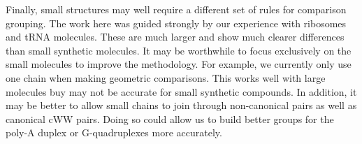 Finally, small structures may well require a different set of rules for
comparison grouping. The work here was guided strongly by our experience with
ribosomes and tRNA molecules. These are much larger and show much clearer
differences than small synthetic molecules. It may be worthwhile to focus
exclusively on the small molecules to improve the methodology. For example, we
currently only use one chain when making geometric comparisons. This works well
with large molecules buy may not be accurate for small synthetic compounds. In
addition, it may be better to allow small chains to join through non-canonical
pairs as well as canonical cWW pairs. Doing so could allow us to build better
groups for the poly-A duplex or G-quadruplexes more accurately.
